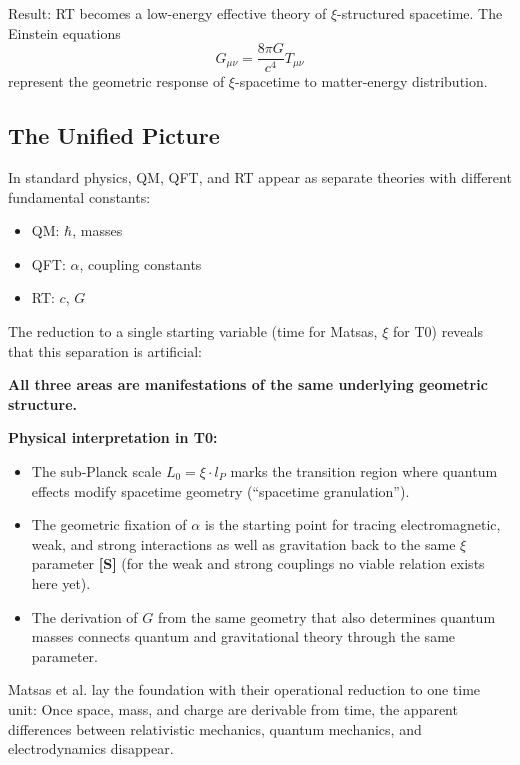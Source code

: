 	Result: RT becomes a low-energy effective theory of $\xi$-structured spacetime. The Einstein equations
	\[
	G_{\mu\nu} = \frac{8\pi G}{c^4} T_{\mu\nu}
	\]
	represent the geometric response of $\xi$-spacetime to matter-energy distribution.
	
	\subsection{The Unified Picture}
	
	In standard physics, QM, QFT, and RT appear as separate theories with different fundamental constants:
	\begin{itemize}
		\item QM: $\hbar$, masses
		\item QFT: $\alpha$, coupling constants
		\item RT: $c$, $G$
	\end{itemize}
	
	The reduction to a single starting variable (time for Matsas, $\xi$ for T0) reveals that this separation is artificial:
	
	\begin{insight}
		\textbf{All three areas are manifestations of the same underlying geometric structure.}
	\end{insight}
	
	\textbf{Physical interpretation in T0:}
	
	\begin{itemize}
		\item The sub-Planck scale $L_0 = \xi \cdot l_P$ marks the transition region where quantum effects modify spacetime geometry (``spacetime granulation'').
		
		\item The geometric fixation of $\alpha$ is the starting point for tracing electromagnetic, weak, and strong interactions as well as gravitation back to the same $\xi$ parameter \textbf{[S]} (for the weak and strong couplings no viable relation exists here yet).
		
		\item The derivation of $G$ from the same geometry that also determines quantum masses connects quantum and gravitational theory through the same parameter.
	\end{itemize}
	
	Matsas et al. lay the foundation with their operational reduction to one time unit: Once space, mass, and charge are derivable from time, the apparent differences between relativistic mechanics, quantum mechanics, and electrodynamics disappear.
	
